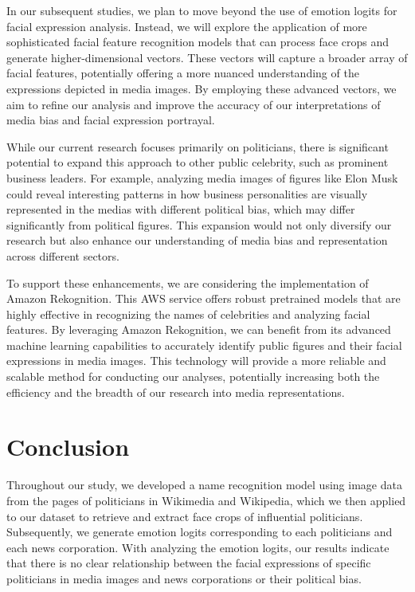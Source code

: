 \documentclass[sigconf]{acmart}
\begin{document}
In our subsequent studies, we plan to move beyond the use of emotion logits for facial expression analysis. Instead, we will explore the application of more sophisticated facial feature recognition models that can process face crops and generate higher-dimensional vectors. These vectors will capture a broader array of facial features, potentially offering a more nuanced understanding of the expressions depicted in media images. By employing these advanced vectors, we aim to refine our analysis and improve the accuracy of our interpretations of media bias and facial expression portrayal.

While our current research focuses primarily on politicians, there is significant potential to expand this approach to other public celebrity, such as prominent business leaders. For example, analyzing media images of figures like Elon Musk could reveal interesting patterns in how business personalities are visually represented in the medias with different political bias, which may differ significantly from political figures. This expansion would not only diversify our research but also enhance our understanding of media bias and representation across different sectors.

To support these enhancements, we are considering the implementation of Amazon Rekognition. This AWS service offers robust pretrained models that are highly effective in recognizing the names of celebrities and analyzing facial features\cite{reko}. By leveraging Amazon Rekognition, we can benefit from its advanced machine learning capabilities to accurately identify public figures and their facial expressions in media images. This technology will provide a more reliable and scalable method for conducting our analyses, potentially increasing both the efficiency and the breadth of our research into media representations.


\vspace{-10pt}
\section{Conclusion}\label{sec:conclusion}

Throughout our study, we developed a name recognition model using image data from the pages of politicians in Wikimedia and Wikipedia, which we then applied to our dataset to retrieve and extract face crops of influential politicians. Subsequently, we generate emotion logits corresponding to each politicians and each news corporation. With analyzing the emotion logits, our results indicate that there is no clear relationship between the facial expressions of specific politicians in media images and news corporations or their political bias.
\end{document}
